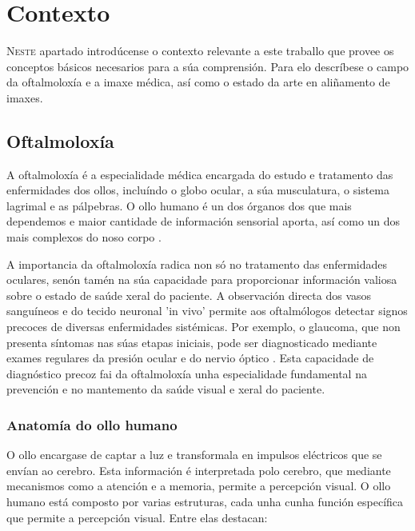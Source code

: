 \chapter{Contexto}
\label{chap:contexto}

\lettrine{N}{este} apartado introdúcense o contexto relevante a este traballo que provee os conceptos básicos necesarios para a súa comprensión.
Para elo descríbese o campo da oftalmoloxía e a imaxe médica, así como o estado da arte en aliñamento de imaxes.
\section{Oftalmoloxía}
\label{sec:Oftalmoloxía}
A oftalmoloxía é a especialidade médica encargada do estudo e tratamento das enfermidades dos ollos, incluíndo o globo ocular, a súa musculatura, o sistema lagrimal e as pálpebras.
O ollo humano é un dos órganos dos que mais dependemos e maior cantidade de información sensorial aporta, así como un dos mais complexos do noso corpo \cite{kanski2011clinical}.

A importancia da oftalmoloxía radica non só no tratamento das enfermidades oculares, senón tamén na súa capacidade para proporcionar información valiosa sobre o estado de saúde xeral do paciente. 
A observación directa dos vasos sanguíneos e do tecido neuronal 'in vivo' permite aos oftalmólogos detectar signos precoces de diversas enfermidades sistémicas.
 Por exemplo, o glaucoma, que non presenta síntomas nas súas etapas iniciais, pode ser diagnosticado mediante exames regulares da presión ocular e do nervio óptico \cite{importglaucoma}.
 Esta capacidade de diagnóstico precoz fai da oftalmoloxía unha especialidade fundamental na prevención e no mantemento da saúde visual e xeral do paciente.

 \subsection{Anatomía do ollo humano}
\label{subsec:Anatomía do ollo humano}
O ollo encargase de captar a luz e transformala en impulsos eléctricos que se envían ao cerebro.
 Esta información é interpretada polo cerebro, que mediante mecanismos como a atención e a memoria, permite a percepción visual. \cite{eyefunct}
 O ollo humano está composto por varias estruturas, cada unha cunha función específica que permite a percepción visual. Entre elas destacan:

